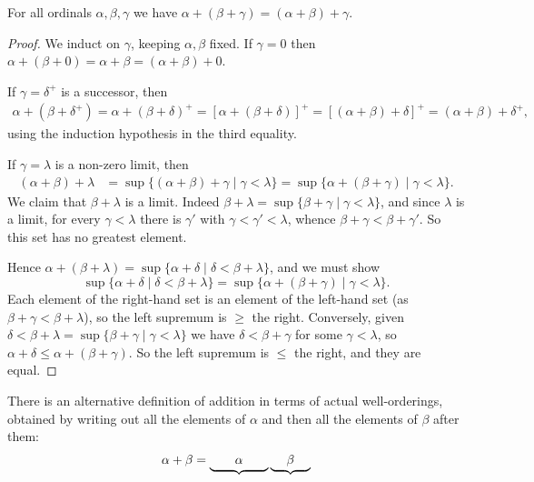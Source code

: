 \begin{proposition}
  For all ordinals $\alpha, \beta, \gamma$ we have $\alpha + (\beta + \gamma) = (\alpha + \beta) + \gamma$.
\end{proposition}
\begin{proof}
We induct on $\gamma$, keeping $\alpha, \beta$ fixed. If $\gamma = 0$ then $\alpha+(\beta+0) = \alpha+\beta = (\alpha+\beta)+0$.

If $\gamma = \delta^+$ is a successor, then
\begin{align*}
  \alpha + (\beta + \delta^+) = \alpha + (\beta + \delta)^+
  = [\alpha + (\beta + \delta)]^+ = [(\alpha + \beta) + \delta]^+
  = (\alpha + \beta) + \delta^+,
\end{align*}
using the induction hypothesis in the third equality.

If $\gamma = \lambda$ is a non-zero limit, then
\begin{align*}
(\alpha+\beta)+\lambda & =\sup \{(\alpha+\beta)+\gamma \mid \gamma<\lambda\} =\sup \{\alpha+(\beta+\gamma) \mid \gamma<\lambda\}.
\end{align*}
We claim that $\beta+\lambda$ is a limit. Indeed $\beta+\lambda=\sup \{\beta+\gamma \mid \gamma<\lambda\}$, and since $\lambda$ is a limit, for every $\gamma < \lambda$ there is $\gamma'$ with $\gamma < \gamma' < \lambda$, whence $\beta + \gamma < \beta + \gamma'$. So this set has no greatest element.

Hence $\alpha + (\beta + \lambda) = \sup\{\alpha + \delta \mid \delta < \beta + \lambda\}$, and we must show
$$\sup\{\alpha + \delta \mid \delta < \beta +\lambda\} = \sup \{\alpha + (\beta + \gamma) \mid \gamma < \lambda\}.$$
Each element of the right-hand set is an element of the left-hand set (as $\beta + \gamma < \beta + \lambda$), so the left supremum is $\geq$ the right. Conversely, given $\delta < \beta + \lambda = \sup\{\beta + \gamma \mid \gamma < \lambda\}$ we have $\delta < \beta + \gamma$ for some $\gamma < \lambda$, so $\alpha + \delta \leq \alpha + (\beta+\gamma)$. So the left supremum is $\leq$ the right, and they are equal.
\end{proof}

There is an alternative definition of addition in terms of actual well-orderings, obtained by writing out all the elements of $\alpha$ and then all the elements of $\beta$ after them:
\[
  \alpha + \beta = \underbrace{\quad\quad\vphantom{\beta}\alpha\vphantom{\beta}\quad\quad}\underbrace{\quad\;\beta\;\quad}
\]


